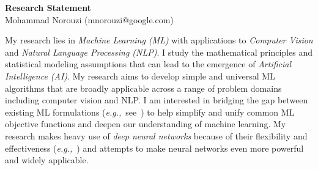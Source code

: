 \documentclass[a4paper, 10pt]{article}
\def\eg{{\em e.g.,}}
\newcommand{\figref}[1]{Figure~\ref{#1}}
\begin{document}
\thispagestyle{fancy}
\lhead{}
\rhead{}
\renewcommand{\headrulewidth}{0pt} 
\renewcommand{\footrulewidth}{0pt} 


\pagestyle{fancy}
\lhead{\textcolor{gray}{\it Mohammad Norouzi}}
\rhead{\textcolor{gray}{\thepage/\totalpages{}}}


\begin{center}
{\LARGE \bf Research Statement}\\
\vspace*{0.1cm}
{\normalsize Mohammad Norouzi (mnorouzi@google.com)}
\vspace*{0.2cm}
\end{center}

My research lies in {\em Machine Learning (ML)} with applications to
{\em Computer Vision} and {\em Natural Language Processing (NLP)}. I
study the mathematical principles and statistical modeling assumptions
that can lead to the emergence of {\em Artificial Intelligence (AI)}.
My research aims to develop simple and universal ML algorithms that
are broadly applicable across a range of problem domains including
computer vision and NLP. I am interested in bridging the gap between
existing ML formulations (\eg~see~\cite{raml,pcl,tpcl}) to help
simplify and unify common ML objective functions and deepen our
understanding of machine learning. My research makes heavy use of {\em
  deep neural networks} because of their flexibility and effectiveness
(\eg~\cite{wu2016gnmt,keypointnet,ocd}) and attempts to make neural
networks even more powerful and widely applicable.

\end{document}
